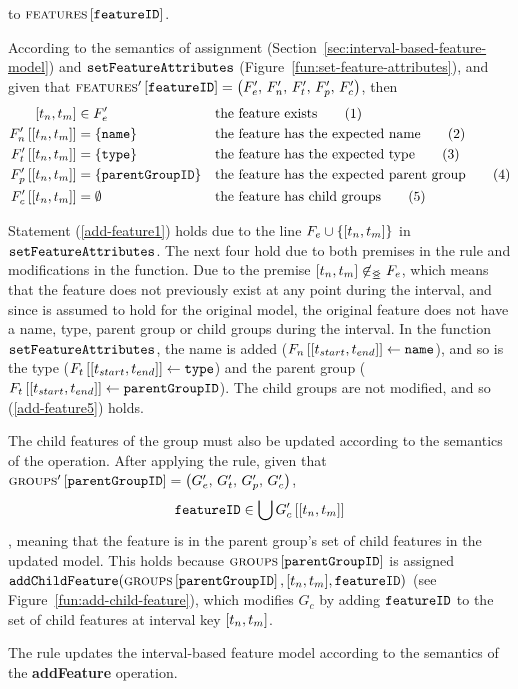 to $\textsc{features} \left[ \texttt{featureID} \right]$. 

According to the semantics of assignment (Section~\vref{sec:interval-based-feature-model}) and $\texttt{setFeatureAttributes}$ (Figure~\vref{fun:set-feature-attributes}), and given that $\textsc{features}' \left[ \texttt{featureID} \right] = \left(F'_e,\, F'_n,\, F'_t,\, F'_p,\, F'_c\right)$, then 
\begin{align}
   \interval{t_n}{t_m} &\in F'_e && \text{the feature exists} \tag{1} \label{add-feature1}\\
   \lookup{F'_n}{\interval{t_n}{t_m}} &= \set{\var{name}} && \text{the feature has the expected name} \tag{2} \label{add-feature2}\\
   \lookup{F'_t}{\interval{t_n}{t_m}} &= \set{\var{type}}  && \text{the feature has the expected type} \tag{3} \label{add-feature3}\\
   \lookup{F'_p}{\interval{t_n}{t_m}} &= \set{\var{parentGroupID}}  && \text{the feature has the expected parent group} \tag{4} \label{add-feature4}\\
   \lookup{F'_c}{\interval{t_n}{t_m}} &= \emptyset && \text{the feature has child groups} \tag{5} \label{add-feature5}
\end{align}

Statement (\ref{add-feature1}) holds due to the line $F_e \cup \set{\interval{t_n}{t_m}}$ in $\texttt{setFeatureAttributes}$. The next four hold due to both premises in the rule and modifications in the function. Due to the premise $\interval{t_n}{t_m} \not \innr F_e$, which means that the feature does not previously exist at any point during the interval, and since  is assumed to hold for the original model, the original feature does not have a name, type, parent group or child groups during the interval. In the function $\texttt{setFeatureAttributes}$, the name is added ($\lookup{F_n}{\interval{t_{start}}{t_{end}}} \assign \var{name}$), and so is the type ($\lookup{F_t}{\interval{t_{start}}{t_{end}}} \assign \var{type}$) and the parent group ($\lookup{F_t}{\interval{t_{start}}{t_{end}}} \assign \var{parentGroupID}$). The child groups are not modified, and so (\ref{add-feature5}) holds.

The child features of the group must also be updated according to the semantics of the operation. After applying the rule, given that $\textsc{groups}{}' \left[ \texttt{parentGroupID} \right] = \left(G'_e,\, G'_t,\, G'_p,\, G'_c\right)$, 
\[
   \var{featureID} \in \bigcup \lookup{G'_c}{\interval{t_n}{t_m}}
\]
, meaning that the feature is in the parent group's set of child features in the updated model. This holds because $\textsc{groups}{} \left[ \texttt{parentGroupID} \right]$ is assigned $\var{addChildFeature}(\lookup{\groups}{\var{parentGroupID}}, \interval{t_n}{t_m}, \var{featureID})$ (see Figure~\vref{fun:add-child-feature}), which modifies $G_c$ by adding $\texttt{featureID}$ to the set of child features at interval key $\interval{t_n}{t_m}$.
\\

\begin{lemma}
   The  rule updates the interval-based feature model according to the semantics of the \textbf{addFeature} operation.
   \label{lemma:add-feature-mod}
\end{lemma}

